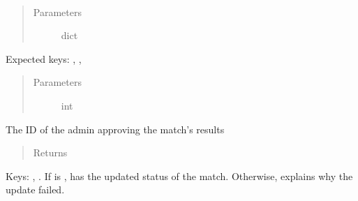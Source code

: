 \documentclass[letterpaper,10pt,english]{sphinxmanual}
\begin{document}

\begin{fulllineitems}
\label{\detokenize{tiger_leagues/models/readme:tiger_leagues.models.admin_model.approve_match}}~\begin{quote}\begin{description}
\item[{Parameters}] \leavevmode
{} \textendash{} dict

\end{description}\end{quote}

Expected keys: , , 
\begin{quote}\begin{description}
\item[{Parameters}] \leavevmode
{} \textendash{} int

\end{description}\end{quote}

The ID of the admin approving the match’s results
\begin{quote}\begin{description}
\item[{Returns}] \leavevmode
{}

\end{description}\end{quote}

Keys: , . If  is ,  has 
the updated status of the match. Otherwise,  explains why the 
update failed.

\end{fulllineitems}

\end{document}
